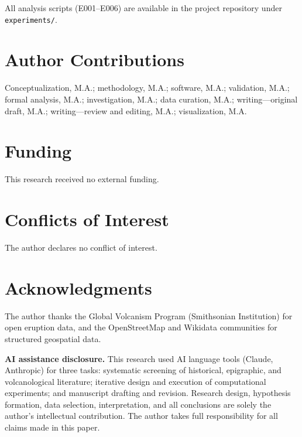 \documentclass[12pt,a4paper]{article}
\begin{document}
All analysis scripts (E001--E006) are available in the project repository under \texttt{experiments/}.

\section*{Author Contributions}

Conceptualization, M.A.; methodology, M.A.; software, M.A.; validation, M.A.; formal analysis, M.A.; investigation, M.A.; data curation, M.A.; writing---original draft, M.A.; writing---review and editing, M.A.; visualization, M.A.

\section*{Funding}

This research received no external funding.

\section*{Conflicts of Interest}

The author declares no conflict of interest.

\section*{Acknowledgments}

The author thanks the Global Volcanism Program (Smithsonian Institution) for open eruption data, and the OpenStreetMap and Wikidata communities for structured geospatial data.

\textbf{AI assistance disclosure.} This research used AI language tools (Claude, Anthropic) for three tasks: systematic screening of historical, epigraphic, and volcanological literature; iterative design and execution of computational experiments; and manuscript drafting and revision. Research design, hypothesis formation, data selection, interpretation, and all conclusions are solely the author's intellectual contribution. The author takes full responsibility for all claims made in this paper.



\end{document}
